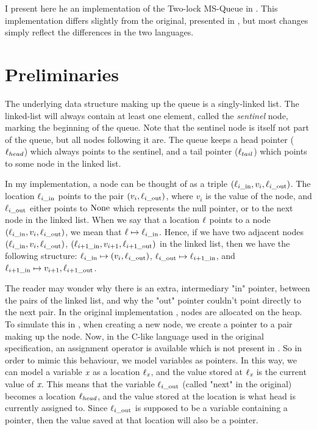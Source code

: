\documentclass[twoside,11pt,openright]{report}
\newcommand{\locin}[1]{\loc_{#1\_\text{in}}}
\newcommand{\locout}[1]{\loc_{#1\_\text{out}}}
\begin{document}
I present here he an implementation of the Two-lock MS-Queue in \heaplang. This implementation differs slightly from the original, presented in \cite{DBLP:conf/podc/MichaelS96}, but most changes simply reflect the differences in the two languages.


\section{Preliminaries}
\label{TLMSQ:section:preliminaries}

The underlying data structure making up the queue is a singly-linked list. The linked-list will always contain at least one element, called the \emph{sentinel} node, marking the beginning of the queue. Note that the sentinel node is itself not part of the queue, but all nodes following it are. The queue keeps a head pointer ($\ell_{head}$) which always points to the sentinel, and a tail pointer ($\ell_{tail}$) which points to some node in the linked list.

In my implementation, a node can be thought of as a triple $(\locin{i}, v_i, \locout{i})$. The location $\locin{i}$ points to the pair $(v_i, \locout{i})$, where $v_i$ is the value of the node, and $\locout{i}$ either points to $\operatorname{None}$ which represents the null pointer, or to the next node in the linked list. When we say that a location $\ell$ points to a node $(\locin{i}, v_i, \locout{i})$, we mean that $\loc \mapsto \locin{i}$. Hence, if we have two adjacent nodes $(\locin{i}, v_i, \locout{i})$, $(\locin{i+1}, v_{i+1}, \locout{i+1})$ in the linked list, then we have the following structure: $\locin{i} \mapsto (v_i, \locout{i})$, $\locout{i} \mapsto \locin{i+1}$, and $\locin{i+1} \mapsto v_{i+1}, \locout{i+1}$.

The reader may wonder why there is an extra, intermediary "in" pointer, between the pairs of the linked list, and why the "out" pointer couldn't point directly to the next pair. In the original implementation \cite{DBLP:conf/podc/MichaelS96}, nodes are allocated on the heap. To simulate this in \heaplang, when creating a new node, we create a pointer to a pair making up the node. Now, in the C-like language used in the original specification, an assignment operator is available which is not present in \heaplang. So in order to mimic this behaviour, we model variables as pointers. In this way, we can model a variable $\textit{x}$ as a location $\ell_{\textit{x}}$, and the value stored at $\ell_{\textit{x}}$ is the current value of $\textit{x}$. This means that the variable $\locout{i}$ (called "next" in the original) becomes a location $\ell_{head}$, and the value stored at the location is what head is currently assigned to. Since $\locout{i}$ is supposed to be a variable containing a pointer, then the value saved at that location will also be a pointer.
\end{document}
